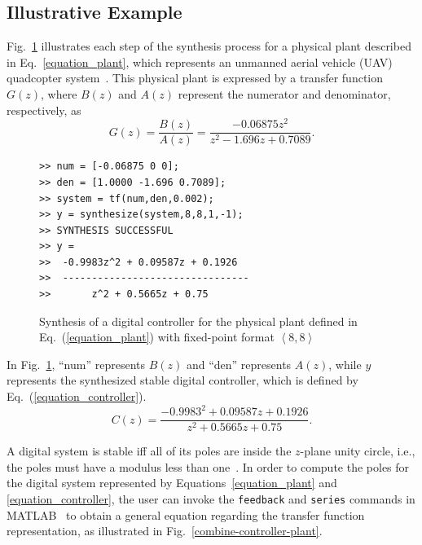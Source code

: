 \documentclass[10pt,conference]{IEEEtran}
\begin{document}
\subsection{Illustrative Example}

Fig.~\ref{toolbox-usage} illustrates each
step of the synthesis process for a physical plant described in
Eq.~\eqref{equation_plant}, which represents an unmanned aerial vehicle
(UAV) quadcopter system~\cite{bouabdallah}.  This physical plant is
expressed by a transfer function $G(z)$, where $B(z)$ and $A(z)$ represent
the numerator and denominator, respectively, as
%
\begin{equation}
\label{equation_plant}
G(z)=\frac{B(z)}{A(z)}=\frac{-0.06875z^{2}}{z^2-1.696z+0.7089}.
\end{equation}

\begin{figure}[ht]
\scriptsize
\begin{lstlisting}[xleftmargin=.025\textwidth,xrightmargin=.025\textwidth, frame=single,basicstyle=\tt]
>> num = [-0.06875 0 0];
>> den = [1.0000 -1.696 0.7089];
>> system = tf(num,den,0.002);
>> y = synthesize(system,8,8,1,-1);
>> SYNTHESIS SUCCESSFUL
>> y = 
>>  -0.9983z^2 + 0.09587z + 0.1926
>>  --------------------------------
>>       z^2 + 0.5665z + 0.75
\end{lstlisting}
\caption{Synthesis of a digital controller for the physical plant
defined in Eq.~(\ref{equation_plant}) with 
fixed-point format $\left\langle 8,8\right\rangle$}
\label{toolbox-usage}
\end{figure}

In Fig.~\ref{toolbox-usage}, ``num'' represents $B(z)$ and ``den'' represents
$A(z)$, while $y$ represents the synthesized stable digital controller,
which is defined by Eq.~(\ref{equation_controller}).
%
\begin{equation}
\label{equation_controller}
C(z)=\frac{-0.9983^{2}+0.09587z+0.1926}{z^2+0.5665z+0.75}.
\end{equation}

A digital system is stable iff all of its poles are inside the
$z$-plane unity circle, i.e., the poles must have a modulus less than
one~\cite{astrom1997computer}.  In order to compute the poles for the
digital system represented by Equations~\eqref{equation_plant} and
\eqref{equation_controller}, the user can invoke the \texttt{feedback} and
\texttt{series} commands in MATLAB~\cite{matlab-toolbox} to obtain a
general equation regarding the transfer function representation, as
illustrated in Fig.~\ref{combine-controller-plant}.
\end{document}
